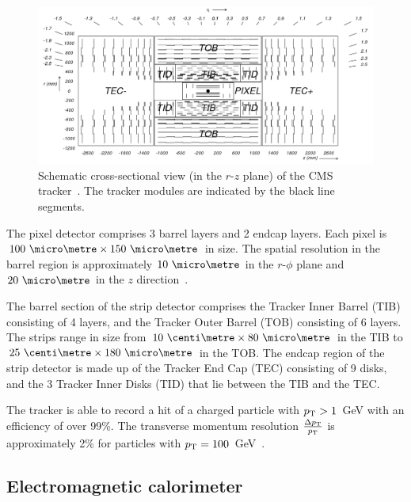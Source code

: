 \begin{figure}
	\begin{center}
		\includegraphics[width=0.8\linewidth]{figs/detector/tracker}
	\end{center}
	\caption{Schematic cross-sectional view (in the $r$-$z$ plane) of the CMS 
		tracker~\cite{cms}. The tracker modules are indicated by the black line 
		segments.}
	\label{fig:tracker}
\end{figure}

The pixel detector comprises 3 barrel layers and 2 endcap layers. Each pixel is 
$100~\micro\metre\times150~\micro\metre$ in size. The spatial 
resolution in the barrel region is approximately $10~\micro\metre$ in the 
{$r$-$\phi$} plane and $20~\micro\metre$ in the $z$ direction~\cite{cms}.

The barrel section of the strip detector comprises the Tracker Inner Barrel 
(TIB) consisting of 4 layers, and the Tracker Outer Barrel (TOB) consisting of 
6 layers. The strips range in size from $10~\centi\metre\times80~\micro\metre$ 
in the TIB to $25~\centi\metre\times180~\micro\metre$ in the TOB. The endcap 
region of the strip detector is made up of the Tracker End Cap (TEC) consisting 
of 9 disks, and the 3 Tracker Inner Disks (TID) that lie between the TIB and 
the TEC.

The tracker is able to record a hit of a charged particle with ${p_{\text T}}>1$~GeV with 
an efficiency of over 99\%. The transverse momentum resolution 
$\frac{\Delta{p_{\text T}}}{{p_{\text T}}}$ is approximately 2\% for particles with ${p_{\text T}} = 
100$~GeV~\cite{cms}.

\subsection{Electromagnetic calorimeter}

